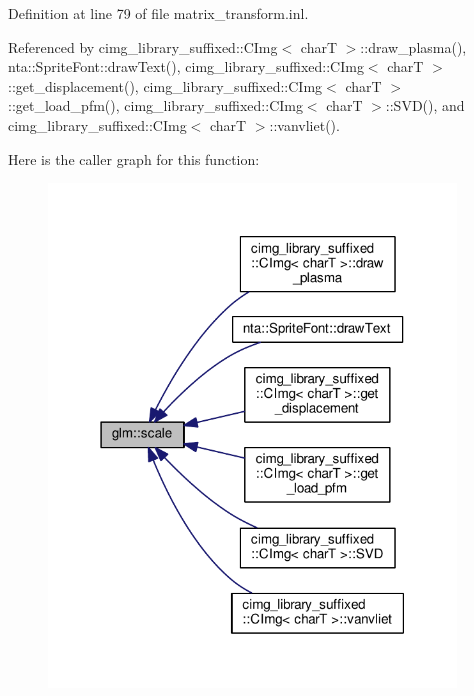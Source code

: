 Definition at line 79 of file matrix\+\_\+transform.\+inl.



Referenced by cimg\+\_\+library\+\_\+suffixed\+::\+C\+Img$<$ char\+T $>$\+::draw\+\_\+plasma(), nta\+::\+Sprite\+Font\+::draw\+Text(), cimg\+\_\+library\+\_\+suffixed\+::\+C\+Img$<$ char\+T $>$\+::get\+\_\+displacement(), cimg\+\_\+library\+\_\+suffixed\+::\+C\+Img$<$ char\+T $>$\+::get\+\_\+load\+\_\+pfm(), cimg\+\_\+library\+\_\+suffixed\+::\+C\+Img$<$ char\+T $>$\+::\+S\+V\+D(), and cimg\+\_\+library\+\_\+suffixed\+::\+C\+Img$<$ char\+T $>$\+::vanvliet().

Here is the caller graph for this function\+:
\nopagebreak
\begin{figure}[H]
\begin{center}
\leavevmode
\includegraphics[width=307pt]{dc/d1c/group__gtc__matrix__transform_ga05051adbee603fb3c5095d8cf5cc229b_icgraph}
\end{center}
\end{figure}
\mbox{\label{group__gtc__matrix__transform_ga1a4ecc4ad82652b8fb14dcb087879284}} 
